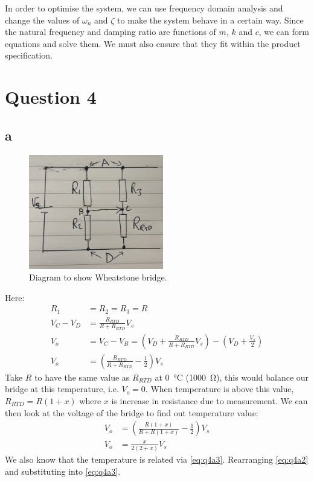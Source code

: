\documentclass[11pt]{article}
\numberwithin{equation}{section}
\begin{document}
In order to optimise the system, we can use frequency domain analysis and change the values of $\omega_n$ and $\zeta$ to make the system behave in a certain way. Since the natural frequency and damping ratio are functions of $m$, $k$ and $c$, we can form equations and solve them. We must also ensure that they fit within the product specification.
\section{Question 4}
\subsection{a}
\begin{figure}[H]
    \centering
    \includegraphics[height = 5cm]{./img/q4a1.jpg}
    \caption{Diagram to show Wheatstone bridge.} 
    \label{fig:q4a1}
\end{figure}
Here:
\begin{align}
    R_1 &= R_2 = R_3 = R\\
    V_C - V_D &= \frac{R_{RTD}}{R+ R_{RTD}}V_s\\
    V_o &= V_C - V_B = \left(V_D + \frac{R_{RTD}}{R+ R_{RTD}}V_s\right) - \left(V_D + \frac{V_s}{2}\right)\\
    V_o &= \left(\frac{R_{RTD}}{R+R_{RTD}} - \frac{1}{2}\right)V_s \label{eq:q4a2}
\end{align}
Take $R$ to have the same value as $R_{RTD}$ at \SI{0}{\celsius} (\SI{1000}{\ohm}), this would balance our bridge at this temperature, i.e. $V_o = 0$. When temperature is above this value, $R_{RTD} = R(1+x)$ where $x$ is increase in resistance due to measurement. We can then look at the voltage of the bridge to find out temperature value:
\begin{align}
    V_o &= \left(\frac{R(1+x)}{R + R(1+x)} - \frac{1}{2}\right)V_s\\
    V_o &= \frac{x}{2(2+x)}V_s
\end{align}
We also know that the temperature is related via \ref{eq:q4a3}. Rearranging \ref{eq:q4a2} and substituting into \ref{eq:q4a3}. 
\end{document}
